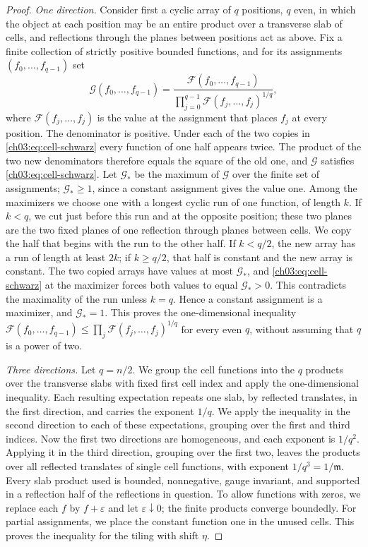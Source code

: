 \begin{proof}
\emph{One direction.} Consider first a cyclic array of $q$ positions, $q$ even, in which the object at each position may be an entire product over a transverse slab of cells, and reflections through the planes between positions act as above. Fix a finite collection of strictly positive bounded functions, and for its assignments $(f_0,\dots,f_{q-1})$ set
\[
 \mathcal G(f_0,\dots,f_{q-1})=\frac{\mathcal F(f_0,\dots,f_{q-1})}{\prod_{j=0}^{q-1}\mathcal F(f_j,\dots,f_j)^{1/q}},
\]
where $\mathcal F(f_j,\dots,f_j)$ is the value at the assignment that places $f_j$ at every position. The denominator is positive. Under each of the two copies in \eqref{ch03:eq:cell-schwarz} every function of one half appears twice. The product of the two new denominators therefore equals the square of the old one, and $\mathcal G$ satisfies \eqref{ch03:eq:cell-schwarz}. Let $\mathcal G_*$ be the maximum of $\mathcal G$ over the finite set of assignments; $\mathcal G_*\ge1$, since a constant assignment gives the value one. Among the maximizers we choose one with a longest cyclic run of one function, of length $k$. If $k<q$, we cut just before this run and at the opposite position; these two planes are the two fixed planes of one reflection through planes between cells. We copy the half that begins with the run to the other half. If $k<q/2$, the new array has a run of length at least $2k$; if $k\ge q/2$, that half is constant and the new array is constant. The two copied arrays have values at most $\mathcal G_*$, and \eqref{ch03:eq:cell-schwarz} at the maximizer forces both values to equal $\mathcal G_*>0$. This contradicts the maximality of the run unless $k=q$. Hence a constant assignment is a maximizer, and $\mathcal G_*=1$. This proves the one-dimensional inequality $\mathcal F(f_0,\dots,f_{q-1})\le\prod_j\mathcal F(f_j,\dots,f_j)^{1/q}$ for every even $q$, without assuming that $q$ is a power of two.

\emph{Three directions.} Let $q=n/2$. We group the cell functions into the $q$ products over the transverse slabs with fixed first cell index and apply the one-dimensional inequality. Each resulting expectation repeats one slab, by reflected translates, in the first direction, and carries the exponent $1/q$. We apply the inequality in the second direction to each of these expectations, grouping over the first and third indices. Now the first two directions are homogeneous, and each exponent is $1/q^2$. Applying it in the third direction, grouping over the first two, leaves the products over all reflected translates of single cell functions, with exponent $1/q^3=1/\mathfrak m$. Every slab product used is bounded, nonnegative, gauge invariant, and supported in a reflection half of the reflections in question. To allow functions with zeros, we replace each $f$ by $f+\varepsilon$ and let $\varepsilon\downarrow0$; the finite products converge boundedly. For partial assignments, we place the constant function one in the unused cells. This proves the inequality for the tiling with shift $\eta$.
\end{proof}

